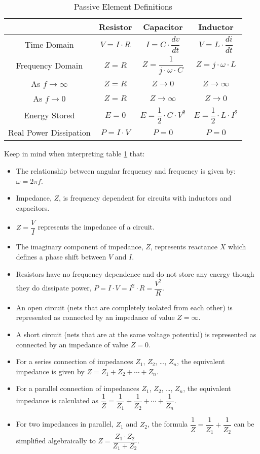 \documentclass[main.tex]{subfiles}
\begin{document}
\begin{table}[H]
    \centering
    \begin{tabular}{|c|c|c|c|}
        \hline
        & Resistor & Capacitor & Inductor \\ \hline
        Time Domain & $V = I \cdot R$ & $I = C \cdot \dfrac{dv}{dt}$ & $V = L \cdot \dfrac{di}{dt}$ \\ \hline
        Frequency Domain & $Z = R$ & $Z = \dfrac{1}{j \cdot \omega \cdot C}$ & $Z = j \cdot \omega \cdot L$ \\ \hline
        As $f \to \infty$ & $Z = R$ & $Z \to 0$ & $Z \to \infty$ \\ \hline
        As $f \to 0$ & $Z = R$ & $Z \to \infty$ & $Z \to 0$ \\ \hline
        Energy Stored & $E = 0$ & $E = \dfrac{1}{2} \cdot C \cdot V^{2}$ & $E = \dfrac{1}{2} \cdot L \cdot I^{2}$ \\ \hline
        Real Power Dissipation & $P = I \cdot V$ & $P = 0$ & $P = 0$ \\ \hline
    \end{tabular}
    \caption{Passive Element Definitions}
    \label{tab:passive_definitions}
\end{table}

\noindent Keep in mind when interpreting table \ref{tab:passive_definitions} that:
\begin{itemize}
    \item The relationship between angular frequency and frequency is given by: $\omega = 2 \pi f$.
    \item Impedance, $Z$, is frequency dependent for circuits with inductors and capacitors.
    \item $Z = \dfrac{V}{I}$ represents the impedance of a circuit. 
    \item The imaginary component of impedance, $Z$, represents reactance $X$ which defines a phase shift between $V$ and $I$.
    \item Resistors have no frequency dependence and do not store any energy though they do dissipate power, $P = I \cdot V = I^{2} \cdot R = \dfrac{V^2}{R}$.
    \item An open circuit (nets that are completely isolated from each other) is represented as connected by an impedance of value $Z = \infty$.
    \item A short circuit (nets that are at the same voltage potential) is represented as connected by an impedance of value $Z = 0$. 
    \item For a series connection of impedances $Z_1$, $Z_2$, \dots, $Z_n$, the equivalent impedance is given by $Z = Z_1 + Z_2 + \cdots + Z_n$.
    \item For a parallel connection of impedances $Z_1$, $Z_2$, \dots, $Z_n$, the equivalent impedance is calculated as $\dfrac{1}{Z} = \dfrac{1}{Z_1} + \dfrac{1}{Z_2} + \cdots + \dfrac{1}{Z_n}$.
    \item For two impedances in parallel, $Z_1$ and $Z_2$, the formula $\dfrac{1}{Z} = \dfrac{1}{Z_1} + \dfrac{1}{Z_2}$ can be simplified algebraically to $Z = \dfrac{Z_1 \cdot Z_2}{Z_1 + Z_2}$. 
\end{itemize}
\end{document}
